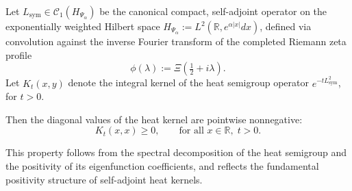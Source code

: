 \begin{lemma}
\label{lem:heat_kernel_diagonal_positivity}
Let \( L_{\mathrm{sym}} \in \mathcal{C}_1(H_{\Psi_\alpha}) \) be the canonical compact, self-adjoint operator on the exponentially weighted Hilbert space \( H_{\Psi_\alpha} := L^2(\mathbb{R}, e^{\alpha |x|} dx) \), defined via convolution against the inverse Fourier transform of the completed Riemann zeta profile
\[
\phi(\lambda) := \Xi\left(\tfrac{1}{2} + i\lambda\right).
\]
Let \( K_t(x, y) \) denote the integral kernel of the heat semigroup operator \( e^{-t L_{\mathrm{sym}}^2} \), for \( t > 0 \).

\medskip
\noindent
Then the diagonal values of the heat kernel are pointwise nonnegative:
\[
K_t(x,x) \geq 0, \qquad \text{for all } x \in \mathbb{R}, \; t > 0.
\]

\medskip
\noindent
This property follows from the spectral decomposition of the heat semigroup and the positivity of its eigenfunction coefficients, and reflects the fundamental positivity structure of self-adjoint heat kernels.
\end{lemma}
